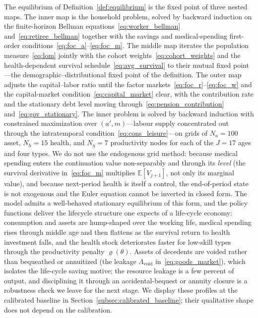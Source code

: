 \documentclass[12pt,a4paper]{article}
\newcommand{\E}{\mathbb{E}}
\begin{document}
The equilibrium of Definition~\ref{def:equilibrium} is the fixed point of three nested maps. The inner map is the household problem, solved by backward induction on the finite-horizon Bellman equations~\eqref{eq:worker_bellman} and~\eqref{eq:retiree_bellman} together with the savings and medical-spending first-order conditions~\eqref{eq:foc_a}--\eqref{eq:foc_m}. The middle map iterates the population measure~\eqref{eq:lom} jointly with the cohort weights~\eqref{eq:cohort_weights} and the health-dependent survival schedule~\eqref{eq:avg_survival} to their mutual fixed point---the demographic--distributional fixed point of the definition. The outer map adjusts the capital--labor ratio until the factor markets~\eqref{eq:foc_r}--\eqref{eq:foc_w} and the capital-market condition~\eqref{eq:capital_market} clear, with the contribution rate and the stationary debt level moving through~\eqref{eq:pension_contribution} and~\eqref{eq:gov_stationary}. The inner problem is solved by backward induction with constrained maximization over $(a',m)$---labour supply concentrated out through the intratemporal condition~\eqref{eq:cons_leisure}---on grids of $N_a=100$ asset, $N_h=15$ health, and $N_\eta=7$ productivity nodes for each of the $J=17$ ages and four types. We do not use the endogenous grid method: because medical spending enters the continuation value non-separably and through its \emph{level} (the survival derivative in~\eqref{eq:foc_m} multiplies $\E[V_{j+1}]$, not only its marginal value), and because next-period health is itself a control, the end-of-period state is not exogenous and the Euler equation cannot be inverted in closed form. The model admits a well-behaved stationary equilibrium of this form, and the policy functions deliver the lifecycle structure one expects of a life-cycle economy: consumption and assets are hump-shaped over the working life, medical spending rises through middle age and then flattens as the survival return to health investment falls, and the health stock deteriorates faster for low-skill types through the productivity penalty $\varrho(\theta)$. Assets of decedents are voided rather than bequeathed or annuitized (the leakage $\Lambda_{\mathrm{void}}$ in~\eqref{eq:goods_market}), which isolates the life-cycle saving motive; the resource leakage is a few percent of output, and disciplining it through an accidental-bequest or annuity closure is a robustness check we leave for the next stage. We display these profiles at the calibrated baseline in Section~\ref{subsec:calibrated_baseline}; their qualitative shape does not depend on the calibration.
\end{document}
